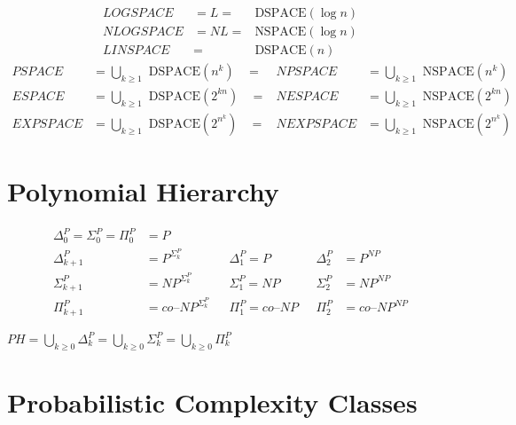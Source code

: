 \documentclass[
    13pt,
    oneside,
    a4paper,
    numbers=enddot,
    abstractoff,
    parskip=full
]{scrreprt}
\begin{document}
\begin{align*}
    LOGSPACE     &= L =& \text{DSPACE}(\log n)
    \\
    NLOGSPACE    &= NL =& \text{NSPACE}(\log n)
    \\
    LINSPACE     &=& \text{DSPACE}(n)
\end{align*}
\begin{align*}
        PSPACE          &= \bigcup_{k \geq 1} \text{ DSPACE}(n^k)
    ~~~~=&  NPSPACE     &= \bigcup_{k \geq 1} \text{ NSPACE}(n^k)
    \\
        ESPACE          &= \bigcup_{k \geq 1} \text{ DSPACE}(2^{kn})
    ~~~~=&  NESPACE     &= \bigcup_{k \geq 1} \text{ NSPACE}(2^{kn})
    \\
        EXPSPACE        &= \bigcup_{k \geq 1} \text{ DSPACE}(2^{n^k})
    ~~~~=&  NEXPSPACE   &= \bigcup_{k \geq 1} \text{ NSPACE}(2^{n^k})
\end{align*}






\section*{Polynomial Hierarchy}
\label{sec:polynomial_hierarchy}


\begin{align*}
    \Delta^P_0 = \Sigma^P_0 = \Pi^P_0 &= P
    \\
        \Delta^P_{k+1} &= P^{\Sigma^P_k}
    &&  \Delta^P_1 = P ~~~& \Delta^P_2 &= P^{NP}
    \\
        \Sigma^P_{k+1} &= NP^{\Sigma^P_k}
    &&  \Sigma^P_1 = NP ~~~& \Sigma^P_2 &= NP^{NP}
    \\
        \Pi^P_{k+1} &= co\text{--}NP^{\Sigma^P_k}
    &&  \Pi^P_1 = co\text{--}NP ~~~& \Pi^P_2 &= co\text{--}NP^{NP}
\end{align*}

$ PH = \bigcup_{k \geq 0} \Delta^P_{k}
     = \bigcup_{k \geq 0} \Sigma^P_{k}
     = \bigcup_{k \geq 0} \Pi^P_{k} $




\section*{Probabilistic Complexity Classes}
\label{sec:probabilistic_complexity_classes}
\end{document}
